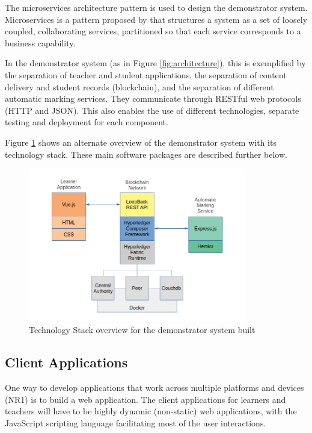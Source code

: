 The microservices architecture pattern is used to design the demonstrator system. Microservices is a pattern proposed by
\citet{richardson2018ms} that structures a system as a set of loosely coupled, collaborating services, partitioned so that
each service corresponds to a business capability.

In the demonstrator system (as in Figure \ref{fig:architecture}), this is exemplified by the separation of teacher and student applications,
the separation of content delivery and student records (blockchain), and the separation of different automatic marking services.
They communicate through RESTful web protocols (HTTP and JSON).
This also enables the use of different technologies, separate testing and deployment for each component.

Figure \ref{fig:techstack} shows an alternate overview of the demonstrator system with its technology stack.
These main software packages are described further below.

\begin{figure}[!ht]
	\centering
	\includegraphics[width=0.85\textwidth]{techstack}
	\caption[Demonstrator Technology Stack]
	{Technology Stack overview for the demonstrator system built}
	\label{fig:techstack}
\end{figure}

\subsection{Client Applications}

One way to develop applications that work across multiple platforms and devices (NR1) is to build a web application.
The client applications for learners and teachers will have to be highly dynamic (non-static) web applications,
with the JavaScript scripting language facilitating most of the user interactions.

